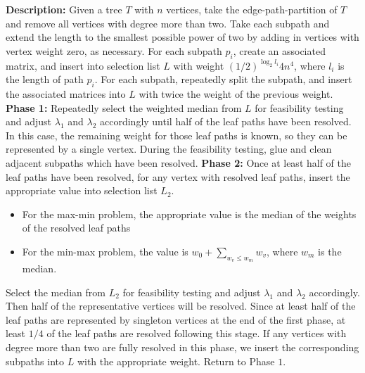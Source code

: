 \documentclass[12pt]{article}
\begin{document}
\begin{spacing}{3}
\newpage
\noindent
\textbf{Description:} 
Given a tree $T$ with $n$ vertices, take the edge-path-partition of $T$ and remove all vertices with degree more than two. Take each subpath and extend the length to the smallest possible power of two by adding in vertices with vertex weight zero, as necessary. For each subpath $p_i$, create an associated matrix, and insert into selection list $L$ with weight $(1/2)^{\log_2 l_i}4n^4$, where $l_i$ is the length of path $p_i$. For each subpath, repeatedly split the subpath, and insert the associated matrices into $L$ with twice the weight of the previous weight.
\newline\noindent
\textbf{Phase 1:} Repeatedly select the weighted median from $L$ for feasibility testing and adjust $\lambda_1$ and $\lambda_2$ accordingly until half of the leaf paths have been resolved. In this case, the remaining weight for those leaf paths is known, so they can be represented by a single vertex. During the feasibility testing, glue and clean adjacent subpaths which have been resolved.
\vskip 0.2in\noindent
\textbf{Phase 2:} Once at least half of the leaf paths have been resolved, for any vertex with resolved leaf paths, insert the appropriate value into selection list $L_2$. 
\begin{itemize}
\item For the max-min problem, the appropriate value is the median of the weights of the resolved leaf paths
\item For the min-max problem, the value is $w_0+\sum_{w_v\le w_m}w_v$, where $w_m$ is the median.
\end{itemize}
Select the median from $L_2$ for feasibility testing and adjust $\lambda_1$ and $\lambda_2$ accordingly. Then half of the representative vertices will be resolved. Since at least half of the leaf paths are represented by singleton vertices at the end of the first phase, at least $1/4$ of the leaf paths are resolved following this stage. If any vertices with degree more than two are fully resolved in this phase, we insert the corresponding subpaths into $L$ with the appropriate weight. Return to Phase $1$. 



\end{spacing}
\end{document}
